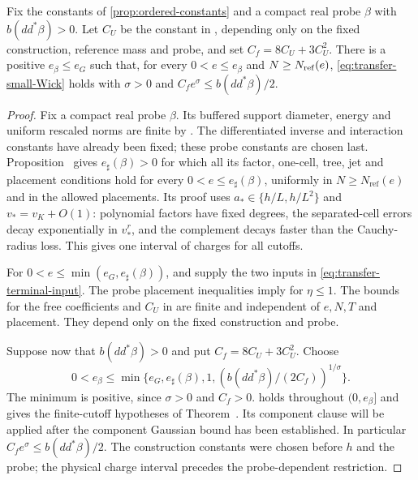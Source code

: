 \begin{proposition}\label{prop:ordered-probe-constants}
Fix the constants of \cref{prop:ordered-constants} and a compact
real probe $\beta$ with $b(dd^*\beta)>0$. Let $C_U$ be the constant
in , depending only on the fixed construction,
reference mass and probe, and set $C_f=8C_U+3C_U^2$.
There is a positive $e_\beta\le e_G$ such that, for every
$0<e\le e_\beta$ and $N\ge N_{\rm ref}(e)$,
\eqref{eq:transfer-small-Wick} holds with $\sigma>0$ and
$C_fe^\sigma\le b(dd^*\beta)/2$.
\end{proposition}

\begin{proof} Fix a compact real probe $\beta$. Its buffered support
diameter, energy and uniform rescaled norms are finite by
.
The differentiated inverse and interaction constants have
already been fixed; these probe constants are chosen last.
Proposition~
gives $e_\sharp(\beta)>0$ for which all its factor,
one-cell, tree, jet and placement conditions hold for
every $0<e\le e_\sharp(\beta)$, uniformly in
$N\ge N_{\mathrm{ref}}(e)$ and in the allowed placements.
Its proof uses $a_*\in\{h/L,h/L^2\}$ and
$v_*=v_K+O(1)$: polynomial factors have fixed degrees,
the separated-cell errors decay exponentially in $v_*^r$,
and the complement decays faster than the Cauchy-radius
loss. This gives one interval of charges for all cutoffs.

For $0<e\le\min(e_G,e_\sharp(\beta))$,
 and
 supply the
two inputs in \eqref{eq:transfer-terminal-input}.
The probe placement inequalities imply
 for $\eta\le1$.
The bounds for the free coefficients and $C_U$ in
 are finite and independent of
$e,N,T$ and placement. They depend only on the fixed
construction and probe.

Suppose now that $b(dd^*\beta)>0$ and put
$C_f=8C_U+3C_U^2$.
Choose
\begin{equation}\label{eq:constants-probe-charge}
 0<e_\beta\le
 \min\{e_G,e_\sharp(\beta),1,
                         (b(dd^*\beta)/(2C_f))^{1/\sigma}\}.
\end{equation}
The minimum is positive, since $\sigma>0$ and $C_f>0$.
 holds throughout
$(0,e_\beta]$ and gives the finite-cutoff hypotheses of
Theorem~. Its component clause will be
applied after the component Gaussian bound has been established.
In particular $C_fe^\sigma\le b(dd^*\beta)/2$.
The construction constants were chosen before $h$ and
the probe; the physical charge interval precedes the
probe-dependent restriction.
\end{proof}


